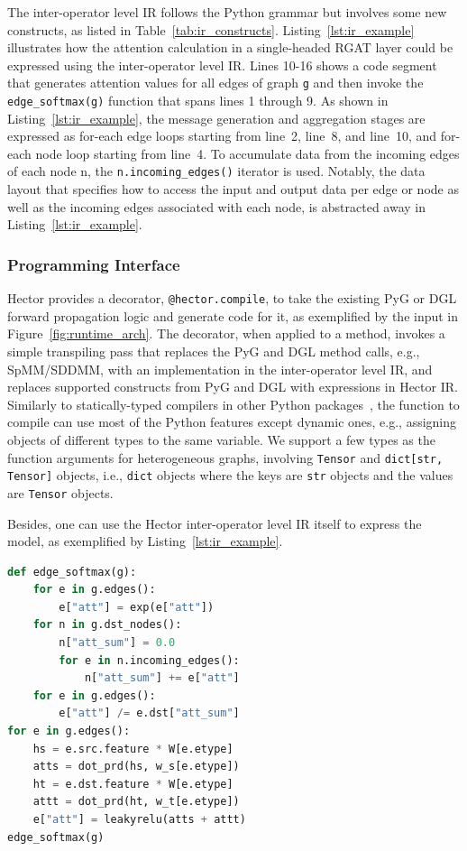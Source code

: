 The inter-operator level IR follows the Python grammar but involves some new constructs, as listed in Table~\ref{tab:ir_constructs}. Listing~\ref{lst:ir_example} illustrates how the attention calculation in a single-headed RGAT layer could be expressed using the inter-operator level IR.
Lines 10-16 shows a code segment that generates attention values for all edges of graph \texttt{g} and then invoke the \texttt{edge\_softmax(g)} function that spans lines 1 through 9. As shown in Listing~\ref{lst:ir_example}, the message generation and aggregation stages are expressed as for-each edge loops starting from line~2, line~8, and line~10, and for-each node loop starting from line~4. To accumulate data from the incoming edges of each node n, the \texttt{n.incoming\_edges()} iterator is used. Notably, the data layout that specifies how to access the input and output data per edge or node as well as the incoming edges associated with each node, is abstracted away in Listing~\ref{lst:ir_example}.



\subsubsection{Programming Interface}
Hector provides a decorator, \texttt{@hector.compile}, to take the existing PyG or DGL forward propagation logic and generate code for it, as exemplified by the input in Figure~\ref{fig:runtime_arch}. The decorator, when applied to a method, invokes a simple transpiling pass that replaces the PyG and DGL method calls, e.g., SpMM/SDDMM,  with an implementation in the inter-operator level IR, and replaces supported constructs from PyG and DGL with expressions in Hector IR.
Similarly to statically-typed compilers in other Python packages~\cite{pytorchTorchScriptPyTorchDocumentation, lamNumbaLLVMbasedPython2015}, the function to compile can use most of the Python features except dynamic ones, e.g., assigning objects of different types to the same variable. We support a few types as the function arguments for heterogeneous graphs, involving \texttt{Tensor} and \texttt{dict[str, Tensor]} objects, i.e., \texttt{dict} objects where the keys are \texttt{str} objects and the values are \texttt{Tensor} objects.

Besides, one can use the Hector inter-operator level IR itself to express the model, as exemplified by Listing~\ref{lst:ir_example}. %


\begin{lstlisting}[caption={Expressing the attention calculation in a single-headed RGAT model using Hector inter-operator level IR.},label={lst:ir_example},language=Python]
def edge_softmax(g):
    for e in g.edges():
        e["att"] = exp(e["att"])
    for n in g.dst_nodes():
        n["att_sum"] = 0.0
        for e in n.incoming_edges():
            n["att_sum"] += e["att"]
    for e in g.edges():
        e["att"] /= e.dst["att_sum"]
for e in g.edges():
    hs = e.src.feature * W[e.etype]
    atts = dot_prd(hs, w_s[e.etype])
    ht = e.dst.feature * W[e.etype]
    attt = dot_prd(ht, w_t[e.etype])  
    e["att"] = leakyrelu(atts + attt)
edge_softmax(g)
\end{lstlisting}


